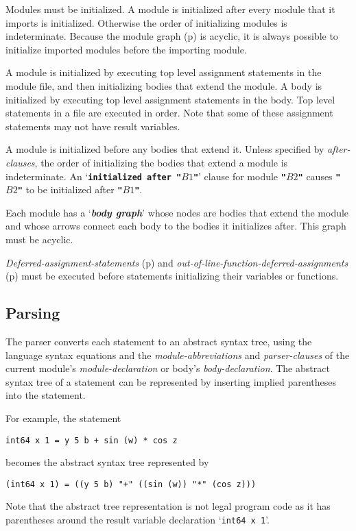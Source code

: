 \documentclass[12pt]{article}
\newcommand{\TT}[1]{{\tt \bfseries #1}}
\newcommand{\key}[1]{{\bf \em #1}\index{#1}}
\newcommand{\pagref}[1]{p\pageref{#1}}
\begin{document}
Modules must be initialized.  A module is initialized after every
module that it imports is initialized.  Otherwise the order of
initializing modules is indeterminate.  Because the module graph
(\pagref{MODULE-GRAPH}) is acyclic, it is always possible to
initialize imported modules before the importing module.

A module is initialized by executing top level assignment statements
in the module file, and then initializing
bodies that extend the module.  A body is initialized
by executing top level assignment statements in the body.
Top level statements in a file are executed in order.
Note that some of these assignment statements may not have
result variables.

A module is initialized before any bodies that extend it.
Unless specified by {\em after-clauses}, the order of initializing the
bodies that extend a module is indeterminate.
An `\TT{initialized after "$B1$"}' clause for module \TT{"$B2$"} causes
\TT{"$B2$"} to be initialized after \TT{"$B1$"}.

Each module has a `\key{body graph}'\label{BODY-GRAPH}
whose nodes are bodies that extend
the module and whose arrows connect each body to the bodies it
initializes after.  This graph must be acyclic.

{\em Deferred-assignment-statements} (\pagref{DEFERRED-ASSIGNMENT-STATEMENTS})
and {\em out-of-line-function-deferred-assignments}
(\pagref{OUT-OF-LINE-FUNCTION-DEFERRED-ASSIGNMENT}) must be executed
before statements initializing their variables or functions.

\subsection{Parsing}

The parser converts each statement to an abstract syntax tree,
using the language syntax equations and the {\em module-abbreviations}
and {\em parser-clauses}
of the current module's {\em module-declaration} or body's
{\em body-declaration}.  The abstract syntax
tree of a statement can be represented by inserting implied
parentheses into the statement.

For example, the statement
\begin{center}
\tt int64 x 1 = y 5 b + sin (w) * cos z
\end{center}
becomes the abstract syntax tree represented by
\begin{center}
\tt (int64 x 1) = ((y 5 b) "+" ((sin (w)) "*" (cos z)))
\end{center}
Note that the abstract tree representation is not legal
program code as it has parentheses around the result
variable declaration `{\tt int64 x 1}'.
\end{document}
